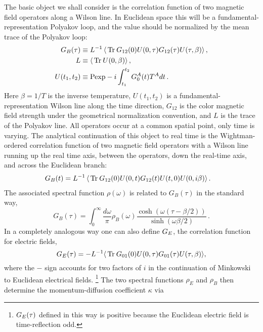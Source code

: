 \documentclass[floatfix,twocolumn,prd,showpacs,preprintnumbers,amsmath,nofootinbib,amssymb,superscriptaddress]{revtex4-2}
\begin{document}
The basic object we shall consider is the correlation function of two magnetic field operators along a Wilson line.
In Euclidean space this will be a fundamental-representation Polyakov loop, and the value should be normalized by the mean trace of the Polyakov loop:
\begin{align}
\label{Geucl}
    G_B(\tau) & \equiv L^{-1} \left\langle \,\mathrm{Tr}\: G_{12}(0) U(0,\tau) G_{12}(\tau) U(\tau,\beta)  \right\rangle ,
    \\
    \label{Ldef}
    L & \equiv \left\langle \,\mathrm{Tr}\: U(0,\beta) \right\rangle ,
    \\
    \label{Wilsonlinedef}
    U(t_1,t_2) & \equiv \mathrm{Pexp} -i\int_{t_1}^{t_2} G_0^A(t) T^A dt \,.
\end{align}
Here $\beta = 1/T$ is the inverse temperature, $U(t_1,t_2)$ is a fundamental-representation Wilson line along the time direction, $G_{12}$ is the color magnetic field strength under the geometrical normalization convention, and $L$ is the trace of the Polyakov line.
All operators occur at a common spatial point, only time is varying.
The analytical continuation of this object to real time is the Wightman-ordered correlation function of two magnetic field operators with a Wilson line running up the real time axis, between the operators, down the real-time axis, and across the Euclidean branch:
\begin{align}
\label{Gmink}
    G_B(t) & = L^{-1} \left\langle \,\mathrm{Tr}\: G_{12}(0) U(0,t) G_{12}(t)
    U(t,0) U(0,i\beta) \right\rangle .
\end{align}
The associated spectral function $\rho(\omega)$ is related to $G_B(\tau)$ in the standard way,
\begin{equation}
\label{continuation}
    G_B(\tau) = \int_0^\infty \frac{d\omega}{\pi} \rho_B(\omega) 
    \frac{\cosh\left(\omega\left(\tau-\beta/2\right)\right)}
    {\sinh(\omega\beta/2)} \,.
\end{equation}
In a completely analogous way one can also define $G_E$, the correlation function for electric fields,
\begin{equation}
\label{GEdef}
    G_E(\tau) = -L^{-1} \langle \,\mathrm{Tr}\: G_{01}(0) U(0,\tau) G_{01}(\tau) U(\tau,\beta) \rangle,
\end{equation}
where the $-$ sign accounts for two factors of $i$ in the continuation of Minkowski to Euclidean electrical fields.%
\footnote{$G_E(\tau)$ defined in this way is positive because the Euclidean electric field is time-reflection odd.}
The two spectral functions $\rho_E$ and $\rho_B$ then determine the momentum-diffusion coefficient $\kappa$ via
\end{document}
